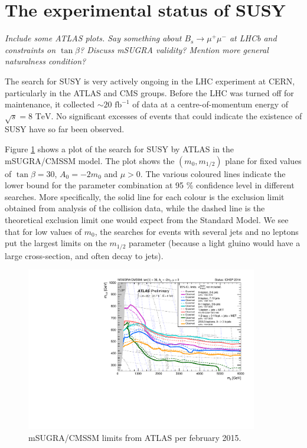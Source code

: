 \documentclass[twoside,english]{uiofysmaster}
\begin{document}



\section{The experimental status of SUSY}
{\it Include some ATLAS plots. Say something about $B_s \to \mu^+ \mu^-$ at LHCb and constraints on $\tan \beta$? Discuss mSUGRA validity? Mention more general naturalness condition?}

The search for SUSY is very actively ongoing in the LHC experiment at CERN, particularly in the ATLAS and CMS groups. Before the LHC was turned off for maintenance, it collected $\sim 20 \,\, \mathrm{fb}^{-1}$ of data at a centre-of-momentum energy of $\sqrt{s} = 8\,\,\mathrm{TeV}$. No significant excesses of events that could indicate the existence of SUSY have so far been observed. 

Figure \ref{fig:ATLAS_mSUGRA} shows a plot of the search for SUSY by ATLAS in the mSUGRA/CMSSM model. The plot shows the $(m_0,m_{1/2})$ plane for fixed values of $\tan\beta = 30$, $A_0 = -2m_0$ and $\mu>0$. The various coloured lines indicate the lower bound for the parameter combination at 95 \% confidence level in different searches. More specifically, the solid line for each colour is the exclusion limit obtained from analysis of the collision data, while the dashed line is the theoretical exclusion limit one would expect from the Standard Model. We see that for low values of $m_0$, the searches for events with several jets and no leptons put the largest limits on the $m_{1/2}$ parameter (because a light gluino would have a large cross-section, and often decay to jets).
\begin{figure}[hbt]
	\centering
	\includegraphics[width=0.9\textwidth]{figures/susyintro/ATLAS_SUSY_MSUGRA.pdf}
	\caption{mSUGRA/CMSSM limits from ATLAS per february 2015. }
	\label{fig:ATLAS_mSUGRA}
\end{figure}
\end{document}
